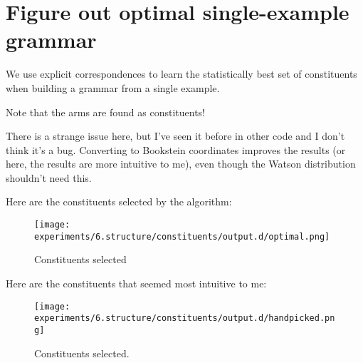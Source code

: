 \section{Figure out optimal single-example grammar}

We use explicit correspondences to learn the statistically best set of
constituents when building a grammar from a single example.

Note that the arms are found as constituents!

There is a strange issue here, but I've seen it before in other code
and I don't think it's a bug. Converting to Bookstein coordinates
improves the results (or here, the results are more intuitive to me),
even though the Watson distribution shouldn't need this.

Here are the constituents selected by the algorithm:

\begin{figure}
\texttt{[image: experiments/6.structure/constituents/output.d/optimal.png]}
\caption{Constituents selected}
\end{figure}

Here are the constituents that seemed most intuitive to me:

\begin{figure}
\texttt{[image: experiments/6.structure/constituents/output.d/handpicked.png]}
\caption{Constituents selected.}
\end{figure}